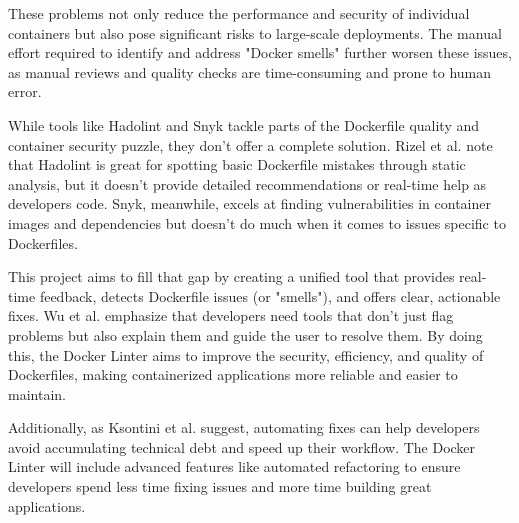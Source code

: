 These problems not only reduce the performance and security of individual containers but also pose significant risks to large-scale deployments. The manual effort required to identify and address "Docker smells" further worsen these issues, as manual reviews and quality checks are time-consuming and prone to human error.

While tools like Hadolint and Snyk tackle parts of the Dockerfile quality and container security puzzle, they don’t offer a complete solution. Rizel et al. note that Hadolint is great for spotting basic Dockerfile mistakes through static analysis, but it doesn’t provide detailed recommendations or real-time help as developers code\cite{CharacterizingtheOccurrenceofDockerfile}. Snyk, meanwhile, excels at finding vulnerabilities in container images and dependencies but doesn’t do much when it comes to issues specific to Dockerfiles.

This project aims to fill that gap by creating a unified tool that provides real-time feedback, detects Dockerfile issues (or "smells"), and offers clear, actionable fixes. Wu et al. emphasize that developers need tools that don’t just flag problems but also explain them and guide the user to resolve them\cite{CharacterizingtheOccurrenceofDockerfile}. By doing this, the Docker Linter aims to improve the security, efficiency, and quality of Dockerfiles, making containerized applications more reliable and easier to maintain.

Additionally, as Ksontini et al. suggest, automating fixes can help developers avoid accumulating technical debt and speed up their workflow\cite{ksontini2021refactorings}. The Docker Linter will include advanced features like automated refactoring to ensure developers spend less time fixing issues and more time building great applications.


